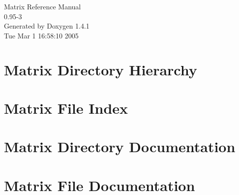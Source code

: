 \documentclass[letterpaper]{article}
\begin{document}
\begin{titlepage}
\vspace*{7cm}
\begin{center}
{\Large Matrix Reference Manual\\[1ex]\large 0.95-3 }\\
\vspace*{1cm}
{\large Generated by Doxygen 1.4.1}\\
\vspace*{0.5cm}
{\small Tue Mar 1 16:58:10 2005}\\
\end{center}
\end{titlepage}
\tableofcontents
{}
\section{Matrix Directory Hierarchy}

\section{Matrix File Index}

\section{Matrix Directory Documentation}

\section{Matrix File Documentation}














































\printindex
\end{document}
